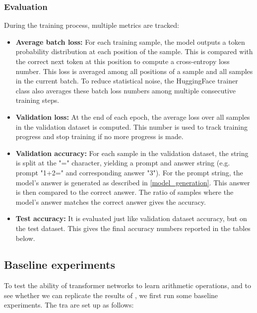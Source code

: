 \subsubsection{Evaluation}

During the training process, multiple metrics are tracked:

\begin{itemize}
	\item \textbf{Average batch loss:}
	For each training sample, the model outputs a token probability distribution at each position of the sample. This is compared with the correct next token at this position to compute a cross-entropy loss number. This loss is averaged among all positions of a sample and all samples in the current batch. To reduce statistical noise, the HuggingFace trainer class also averages these batch loss numbers among multiple consecutive training steps.
	
	\item \textbf{Validation loss:}
	At the end of each epoch, the average loss over all samples in the validation dataset is computed. This number is used to track training progress and stop training if no more progress is made.
	
	\item \textbf{Validation accuracy:}
	For each sample in the validation dataset, the string is split at the "=" character, yielding a prompt and answer string (e.g. prompt "1+2=" and corresponding answer "3"). For the prompt string, the model's answer is generated as described in \cref{model_generation}. This answer is then compared to the correct answer. The ratio of samples where the model's answer matches the correct answer gives the accuracy.
	
	\item \textbf{Test accuracy:}
	It is evaluated just like validation dataset accuracy, but on the test dataset. This gives the final accuracy numbers reported in the tables below.
\end{itemize}





\subsection{Baseline experiments}
\label{setup:baseline}

To test the ability of transformer networks to learn arithmetic operations, and to see whether we can replicate the results of \cite{teaching}, we first run some baseline experiments. The tra are set up as follows:


